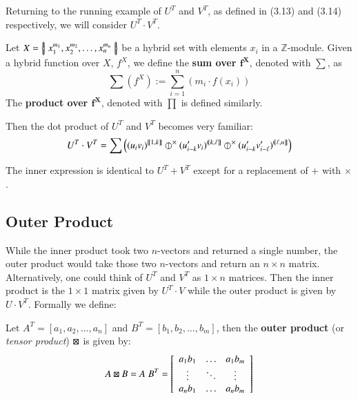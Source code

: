 Returning to the running example of $U^T$ and $V^T$, as defined in (3.13) and (3.14) respectively, we will consider $U^T \cdot V^T$.

\begin{definition}
	Let $X = \hset{x_1^{m_1}, x_2^{m_2}, \ldots , x_n^{m_n} }$ be a hybrid set with elements $x_i$ in a $\mathbb{Z}$-module.
	Given a hybrid function over $X$,  $f^X$, we define the \textbf{sum over $\boldsymbol{f^X}$}, denoted with $\sum$, as
	\begin{equation}
		\sum \! \left( f^X \right)  := \sum_{i=1}^n \left( m_i \cdot f(x_i) \right)
	\end{equation}
	The \textbf{product over $\boldsymbol{f^X}$}, denoted with $\prod$ is defined similarly.
\end{definition}

Then the dot product of $U^T$ and $V^T$ becomes very familiar:
\begin{equation}
	U^T \cdot V^T = \sum \left( (u_i v_i)^{[\![1, k]\!]} 
		\hjoin[\times] (u'_{i-k} v_i)^{(\!(k,\ell]\!]} 
		\hjoin[\times] (u'_{i-k} v'_{i-\ell})^{(\!(\ell,n]\!]} \right)
\end{equation}

The inner expression is identical to $U^T + V^T$ except for a replacement of $+$ with $\times$.




\subsection{Outer Product}

While the inner product took two $n$-vectors and returned a single number,
the outer product would take those two $n$-vectors and return an $n \times n$ matrix.
Alternatively, one could think of $U^T$ and $V^T$ as $1\times n$ matrices.
Then the inner product is the $1\times 1$ matrix given by $U^T \cdot V$ 
while the outer product is given by $U \cdot V^T$. Formally we define:

\begin{definition}
	Let $A^T = [ a_1, a_2, \ldots, a_n]$ and $B^T = [ b_1, b_2, \ldots, b_m]$,
	then the \textbf{outer product} (or \emph{tensor product}) $\outerproduct$ is given by:
	\begin{equation}
		A \outerproduct B = A \; B^T = \left[
			\begin{array}{ccc}
				a_1 b_1 & \ldots 	& a_1 b_m \\
				\vdots 	& \ddots & \vdots \\
				a_n b_1 & \ldots 	& a_n b_m
			\end{array}
		\right]
	\end{equation}
\end{definition}

